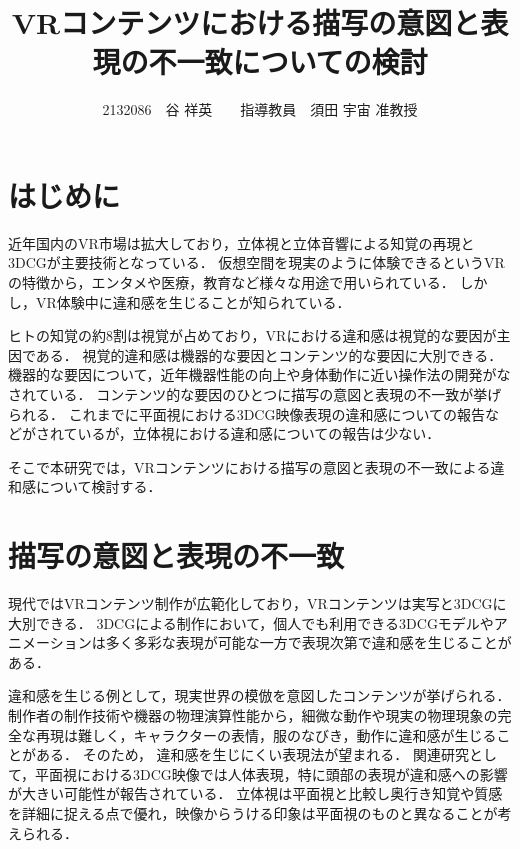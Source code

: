 \documentclass[twocolumn,10pt,a4j]{ltjsarticle}
\title{VRコンテンツにおける描写の意図と表現の不一致についての検討}
\author{2132086　谷 祥英　　指導教員　須田 宇宙 准教授}
\date{}
\begin{document}
\maketitle

\section{はじめに}

近年国内のVR市場は拡大しており，立体視と立体音響による知覚の再現と3DCGが主要技術となっている．
仮想空間を現実のように体験できるというVRの特徴から，エンタメや医療，教育など様々な用途で用いられている．
しかし，VR体験中に違和感を生じることが知られている．

ヒトの知覚の約8割は視覚が占めており，VRにおける違和感は視覚的な要因が主因である．
視覚的違和感は機器的な要因とコンテンツ的な要因に大別できる．
機器的な要因について，近年機器性能の向上や身体動作に近い操作法の開発がなされている．
コンテンツ的な要因のひとつに描写の意図と表現の不一致が挙げられる．
これまでに平面視における3DCG映像表現の違和感についての報告などがされているが，立体視における違和感についての報告は少ない．


そこで本研究では，VRコンテンツにおける描写の意図と表現の不一致による違和感について検討する．

\section{描写の意図と表現の不一致}
現代ではVRコンテンツ制作が広範化しており，VRコンテンツは実写と3DCGに大別できる．
3DCGによる制作において，個人でも利用できる3DCGモデルやアニメーションは多く多彩な表現が可能な一方で表現次第で違和感を生じることがある．

違和感を生じる例として，現実世界の模倣を意図したコンテンツが挙げられる．
制作者の制作技術や機器の物理演算性能から，細微な動作や現実の物理現象の完全な再現は難しく，キャラクターの表情，服のなびき，動作に違和感が生じることがある．
そのため，%
違和感を生じにくい表現法が望まれる．
関連研究として，平面視における3DCG映像では人体表現，特に頭部の表現が違和感への影響が大きい可能性が報告されている\cite{previous1}．
立体視は平面視と比較し奥行き知覚や質感を詳細に捉える点で優れ，映像からうける印象は平面視のものと異なることが考えられる．
\end{document}
